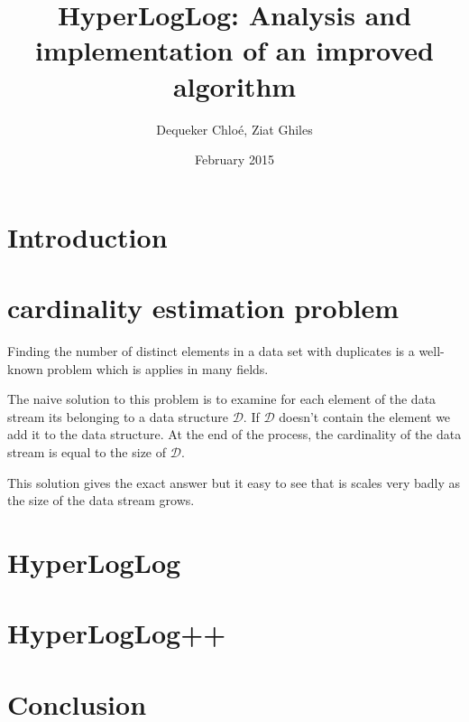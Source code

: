 \documentclass{article}
\title{HyperLogLog: Analysis and implementation of an improved algorithm}
\author{Dequeker Chloé, Ziat Ghiles}
\date{February 2015}
\begin{document}
\maketitle
\clearpage

\tableofcontents
\clearpage

\section{Introduction}

\section{cardinality estimation problem}
Finding the number of distinct elements in a data set with duplicates
is a well-known problem which is applies in many fields.

The naive solution to this problem is to examine for each element of
the data stream its belonging to a data structure $\mathcal{D}$. If
$\mathcal{D}$ doesn't contain the element we add it to the data
structure. At the end of the process, the cardinality of the data
stream is equal to the size of $\mathcal{D}$.

This solution gives the exact answer but it easy to see that is scales
very badly as the size of the data stream grows.

\section{HyperLogLog}

\section{HyperLogLog++}

\section{Conclusion}
\end{document}
